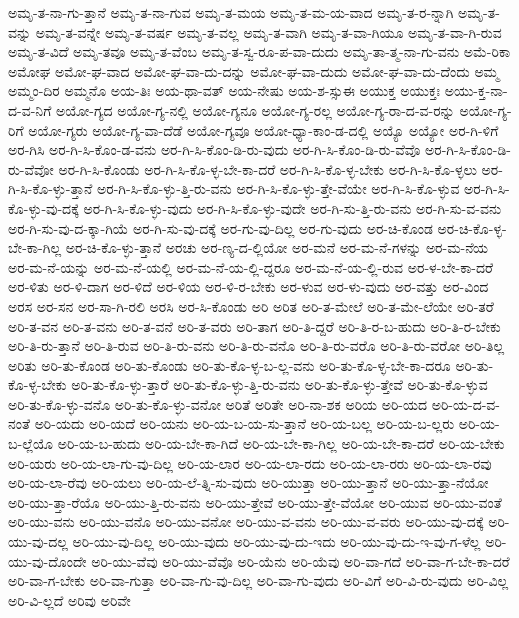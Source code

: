 {ಅಮೃ-ತ-ನಾ-ಗು-ತ್ತಾನೆ
ಅಮೃ-ತ-ನಾ-ಗುವ
ಅಮೃ-ತ-ಮಯ
ಅಮೃ-ತ-ಮ-ಯ-ವಾದ
ಅಮೃ-ತ-ರ-ನ್ನಾಗಿ
ಅಮೃ-ತ-ವನ್ನು
ಅಮೃ-ತ-ವನ್ನೇ
ಅಮೃ-ತ-ವರ್ಷ
ಅಮೃ-ತ-ವಲ್ಲ
ಅಮೃ-ತ-ವಾಗಿ
ಅಮೃ-ತ-ವಾ-ಗಿಯೂ
ಅಮೃ-ತ-ವಾ-ಗಿ-ರುವ
ಅಮೃ-ತ-ವಿದೆ
ಅಮೃ-ತವೂ
ಅಮೃ-ತ-ವೆಂಬ
ಅಮೃ-ತ-ಸ್ವ-ರೂ-ಪ-ವಾ-ದುದು
ಅಮೃ-ತಾ-ತ್ಮ-ನಾ-ಗು-ವನು
ಅಮೆ-ರಿಕಾ
ಅಮೋಘ
ಅಮೋ-ಘ-ವಾದ
ಅಮೋ-ಘ-ವಾ-ದು-ದನ್ನು
ಅಮೋ-ಘ-ವಾ-ದುದು
ಅಮೋ-ಘ-ವಾ-ದು-ದೆಂದು
ಅಮ್ಮ
ಅಮ್ಮಂ-ದಿರ
ಅಮ್ಮನೊ
ಅಯ-ತಿಃ
ಅಯ-ಥಾ-ವತ್
ಅಯ-ನೇಷು
ಅಯ-ಶ-ಸ್ಸುಈ
ಅಯುಕ್ತ
ಅಯುಕ್ತಃ
ಅಯು-ಕ್ತ-ನಾ-ದ-ವ-ನಿಗೆ
ಅಯೋ-ಗ್ಯದ
ಅಯೋ-ಗ್ಯ-ನಲ್ಲಿ
ಅಯೋ-ಗ್ಯನೂ
ಅಯೋ-ಗ್ಯ-ರಲ್ಲ
ಅಯೋ-ಗ್ಯ-ರಾ-ದ-ವ-ರನ್ನು
ಅಯೋ-ಗ್ಯ-ರಿಗೆ
ಅಯೋ-ಗ್ಯರು
ಅಯೋ-ಗ್ಯ-ವಾ-ದೆಡೆ
ಅಯೋ-ಗ್ಯವೂ
ಅಯೋ-ಧ್ಯಾ-ಕಾಂ-ಡ-ದಲ್ಲಿ
ಅಯ್ಯೊ
ಅಯ್ಯೋ
ಅರ-ಗಿ-ಳಿಗೆ
ಅರ-ಗಿಸಿ
ಅರ-ಗಿ-ಸಿ-ಕೊಂ-ಡ-ವನು
ಅರ-ಗಿ-ಸಿ-ಕೊಂ-ಡಿ-ರು-ವುದು
ಅರ-ಗಿ-ಸಿ-ಕೊಂ-ಡಿ-ರು-ವೆವೊ
ಅರ-ಗಿ-ಸಿ-ಕೊಂ-ಡಿ-ರು-ವೆವೋ
ಅರ-ಗಿ-ಸಿ-ಕೊಂಡು
ಅರ-ಗಿ-ಸಿ-ಕೊ-ಳ್ಳ-ಬೇ-ಕಾ-ದರೆ
ಅರ-ಗಿ-ಸಿ-ಕೊ-ಳ್ಳ-ಬೇಕು
ಅರ-ಗಿ-ಸಿ-ಕೊ-ಳ್ಳಲು
ಅರ-ಗಿ-ಸಿ-ಕೊ-ಳ್ಳು-ತ್ತಾನೆ
ಅರ-ಗಿ-ಸಿ-ಕೊ-ಳ್ಳು-ತ್ತಿ-ರು-ವನು
ಅರ-ಗಿ-ಸಿ-ಕೊ-ಳ್ಳು-ತ್ತೇ-ವೆಯೇ
ಅರ-ಗಿ-ಸಿ-ಕೊ-ಳ್ಳುವ
ಅರ-ಗಿ-ಸಿ-ಕೊ-ಳ್ಳು-ವು-ದಕ್ಕೆ
ಅರ-ಗಿ-ಸಿ-ಕೊ-ಳ್ಳು-ವುದು
ಅರ-ಗಿ-ಸಿ-ಕೊ-ಳ್ಳು-ವುದೇ
ಅರ-ಗಿ-ಸು-ತ್ತಿ-ರು-ವನು
ಅರ-ಗಿ-ಸು-ವ-ವನು
ಅರ-ಗಿ-ಸು-ವು-ದ-ಕ್ಕಾ-ಗಿಯೆ
ಅರ-ಗಿ-ಸು-ವು-ದಕ್ಕೆ
ಅರ-ಗು-ವು-ದಿಲ್ಲ
ಅರ-ಗು-ವುದು
ಅರ-ಚಿ-ಕೊಂಡ
ಅರ-ಚಿ-ಕೊ-ಳ್ಳ-ಬೇ-ಕಾ-ಗಿಲ್ಲ
ಅರ-ಚಿ-ಕೊ-ಳ್ಳು-ತ್ತಾನೆ
ಅರಚು
ಅರ-ಣ್ಯ-ದ-ಲ್ಲಿಯೋ
ಅರ-ಮನೆ
ಅರ-ಮ-ನೆ-ಗಳನ್ನು
ಅರ-ಮ-ನೆಯ
ಅರ-ಮ-ನೆ-ಯನ್ನು
ಅರ-ಮ-ನೆ-ಯಲ್ಲಿ
ಅರ-ಮ-ನೆ-ಯ-ಲ್ಲಿ-ದ್ದರೂ
ಅರ-ಮ-ನೆ-ಯ-ಲ್ಲಿ-ರುವ
ಅರ-ಳ-ಬೇ-ಕಾ-ದರೆ
ಅರ-ಳಿತು
ಅರ-ಳಿ-ದಾಗ
ಅರ-ಳಿದೆ
ಅರ-ಳಿಯ
ಅರ-ಳಿ-ರ-ಬೇಕು
ಅರ-ಳುವ
ಅರ-ಳು-ವುದು
ಅರ-ವತ್ತು
ಅರ-ವಿಂದ
ಅರಸ
ಅರ-ಸನ
ಅರ-ಸಾ-ಗಿ-ರಲಿ
ಅರಸಿ
ಅರ-ಸಿ-ಕೊಂಡು
ಅರಿ
ಅರಿತ
ಅರಿ-ತ-ಮೇಲೆ
ಅರಿ-ತ-ಮೇ-ಲೆಯೇ
ಅರಿ-ತರೆ
ಅರಿ-ತ-ವನ
ಅರಿ-ತ-ವನು
ಅರಿ-ತ-ವನೆ
ಅರಿ-ತ-ವರು
ಅರಿ-ತಾಗ
ಅರಿ-ತಿ-ದ್ದರೆ
ಅರಿ-ತಿ-ರ-ಬ-ಹುದು
ಅರಿ-ತಿ-ರ-ಬೇಕು
ಅರಿ-ತಿ-ರು-ತ್ತಾನೆ
ಅರಿ-ತಿ-ರುವ
ಅರಿ-ತಿ-ರು-ವನು
ಅರಿ-ತಿ-ರು-ವನೊ
ಅರಿ-ತಿ-ರು-ವರೊ
ಅರಿ-ತಿ-ರು-ವರೋ
ಅರಿ-ತಿಲ್ಲ
ಅರಿತು
ಅರಿ-ತು-ಕೊಂಡ
ಅರಿ-ತು-ಕೊಂಡು
ಅರಿ-ತು-ಕೊ-ಳ್ಳ-ಬ-ಲ್ಲ-ವನು
ಅರಿ-ತು-ಕೊ-ಳ್ಳ-ಬೇ-ಕಾ-ದರೂ
ಅರಿ-ತು-ಕೊ-ಳ್ಳ-ಬೇಕು
ಅರಿ-ತು-ಕೊ-ಳ್ಳು-ತ್ತಾರೆ
ಅರಿ-ತು-ಕೊ-ಳ್ಳು-ತ್ತಿ-ರು-ವನು
ಅರಿ-ತು-ಕೊ-ಳ್ಳು-ತ್ತೇವೆ
ಅರಿ-ತು-ಕೊ-ಳ್ಳುವ
ಅರಿ-ತು-ಕೊ-ಳ್ಳು-ವನೊ
ಅರಿ-ತು-ಕೊ-ಳ್ಳು-ವನೋ
ಅರಿತೆ
ಅರಿತೇ
ಅರಿ-ನಾ-ಶಕ
ಅರಿಯ
ಅರಿ-ಯದ
ಅರಿ-ಯ-ದ-ವ-ನಂತೆ
ಅರಿ-ಯದು
ಅರಿ-ಯದೆ
ಅರಿ-ಯನು
ಅರಿ-ಯ-ಬ-ಯ-ಸು-ತ್ತಾನೆ
ಅರಿ-ಯ-ಬಲ್ಲ
ಅರಿ-ಯ-ಬ-ಲ್ಲರು
ಅರಿ-ಯ-ಬ-ಲ್ಲೆಯೊ
ಅರಿ-ಯ-ಬ-ಹುದು
ಅರಿ-ಯ-ಬೇ-ಕಾ-ಗಿದೆ
ಅರಿ-ಯ-ಬೇ-ಕಾ-ಗಿಲ್ಲ
ಅರಿ-ಯ-ಬೇ-ಕಾ-ದರೆ
ಅರಿ-ಯ-ಬೇಕು
ಅರಿ-ಯರು
ಅರಿ-ಯ-ಲಾ-ಗು-ವು-ದಿಲ್ಲ
ಅರಿ-ಯ-ಲಾರ
ಅರಿ-ಯ-ಲಾ-ರದು
ಅರಿ-ಯ-ಲಾ-ರರು
ಅರಿ-ಯ-ಲಾ-ರವು
ಅರಿ-ಯ-ಲಾ-ರೆವು
ಅರಿ-ಯಲು
ಅರಿ-ಯ-ಲೆ-ತ್ನಿ-ಸು-ವುದು
ಅರಿ-ಯುತ್ತಾ
ಅರಿ-ಯು-ತ್ತಾನೆ
ಅರಿ-ಯು-ತ್ತಾ-ನೆಯೋ
ಅರಿ-ಯು-ತ್ತಾ-ರೆಯೊ
ಅರಿ-ಯು-ತ್ತಿ-ರು-ವನು
ಅರಿ-ಯು-ತ್ತೇವೆ
ಅರಿ-ಯು-ತ್ತೇ-ವೆಯೋ
ಅರಿ-ಯುವ
ಅರಿ-ಯು-ವಂತೆ
ಅರಿ-ಯು-ವನು
ಅರಿ-ಯು-ವನೊ
ಅರಿ-ಯು-ವನೋ
ಅರಿ-ಯು-ವ-ವನು
ಅರಿ-ಯು-ವ-ವರು
ಅರಿ-ಯು-ವು-ದಕ್ಕೆ
ಅರಿ-ಯು-ವು-ದಲ್ಲ
ಅರಿ-ಯು-ವು-ದಿಲ್ಲ
ಅರಿ-ಯು-ವುದು
ಅರಿ-ಯು-ವು-ದು-ಇದು
ಅರಿ-ಯು-ವು-ದು-ಇ-ವು-ಗ-ಳೆಲ್ಲ
ಅರಿ-ಯು-ವು-ದೊಂದೇ
ಅರಿ-ಯು-ವೆವು
ಅರಿ-ಯು-ವೆವೊ
ಅರಿ-ಯೆನು
ಅರಿ-ಯೆವು
ಅರಿ-ವಾ-ಗದೆ
ಅರಿ-ವಾ-ಗ-ಬೇ-ಕಾ-ದರೆ
ಅರಿ-ವಾ-ಗ-ಬೇಕು
ಅರಿ-ವಾ-ಗುತ್ತಾ
ಅರಿ-ವಾ-ಗು-ವು-ದಿಲ್ಲ
ಅರಿ-ವಾ-ಗು-ವುದು
ಅರಿ-ವಿಗೆ
ಅರಿ-ವಿ-ರು-ವುದು
ಅರಿ-ವಿಲ್ಲ
ಅರಿ-ವಿ-ಲ್ಲದೆ
ಅರಿವು
ಅರಿವೇ
}
